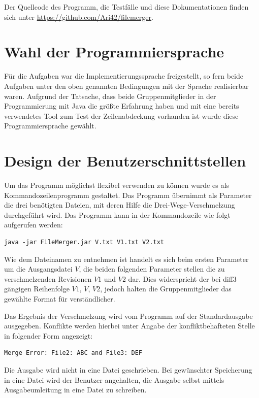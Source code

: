\documentclass[a4paper,titlepage,12pt]{scrartcl}
\begin{document}
Der Quellcode des Programm, die Testfälle und diese Dokumentationen finden sich unter \url{https://github.com/Ari42/filemerger}.

\section{Wahl der Programmiersprache}
\label{sec:proglang}
Für die Aufgaben war die Implementierungssprache freigestellt, so fern beide Aufgaben unter den oben genannten Bedingungen mit der Sprache realisierbar waren.
Aufgrund der Tatsache, dass beide Gruppenmitglieder in der Programmierung mit Java die größte Erfahrung haben und mit \citep{www:ECLEMMA} eine bereits verwendetes Tool zum Test der Zeilenabdeckung vorhanden ist wurde diese Programmiersprache gewählt.

\section{Design der Benutzerschnittstellen}
\label{sec:design}
Um das Programm möglichst flexibel verwenden zu können wurde es als Kommandozeilenprogramm gestaltet.
Das Programm übernimmt als Parameter die drei benötigten Dateien, mit deren Hilfe die Drei-Wege-Verschmelzung durchgeführt wird. Das Programm kann in der Kommandozeile wie folgt aufgerufen werden:

\lstset{language=sh, numbers=none, xleftmargin=0pt}
\begin{lstlisting}
java -jar FileMerger.jar V.txt V1.txt V2.txt
\end{lstlisting}
Wie dem Dateinamen zu entnehmen ist handelt es sich beim ersten Parameter um die Ausgangsdatei $V$,
die beiden folgenden Parameter stellen die zu verschmelzenden Revisionen $V1$ und $V2$ dar.
Dies widerspricht der bei diff3 gängigen Reihenfolge $V1$, $V$, $V2$, jedoch halten die Gruppenmitglieder das gewählte Format für verständlicher.

Das Ergebnis der Verschmelzung wird vom Programm auf der Standardausgabe ausgegeben. Konflikte werden hierbei unter Angabe der konfliktbehafteten Stelle in folgender Form angezeigt:

\begin{verbatim}
Merge Error: File2: ABC and File3: DEF
\end{verbatim}


Die Ausgabe wird nicht in eine Datei geschrieben. Bei gewünschter Speicherung in eine Datei wird der Benutzer angehalten, die Ausgabe selbst mittels Ausgabeumleitung in eine Datei zu schreiben.
\end{document}
